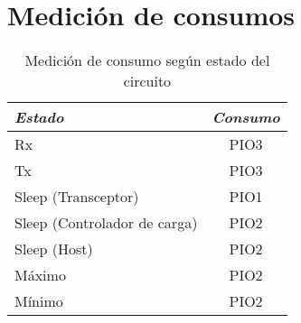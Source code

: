 

\section{Medición de consumos}
\label{sec:Medición}

\begin{table}[ht]
	\centering
	\caption{Medición de consumo según estado del circuito}
	\begin{tabular}{@{} l *1c @{}}    \toprule
		\emph{\textbf{Estado}} & \emph{\textbf{Consumo}}\\
		\midrule
		Rx &  PIO3\\	
		Tx	&  PIO3\\
		Sleep (Transceptor) &  PIO1\\
		Sleep (Controlador de carga) &  PIO2\\
		Sleep (Host) &  PIO2\\
		Máximo &  PIO2\\
		Mínimo &  PIO2\\
		\bottomrule
		\hline
	\end{tabular}
	\label{tab:bq}
\end{table}






